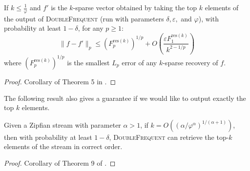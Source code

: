 \documentclass[sigconf,review=true,anonymous=true,screen]{acmart}
\newcommand{\eps}{\varepsilon}
\begin{document}
\begin{theorem}If $k \leq \frac1\varphi$ and $f'$ is the $k$-sparse vector obtained by taking the top $k$ elements of the output
of \textsc{DoubleFrequent} (run with parameters $\delta, \eps, $ and $\varphi$), with probability at least $1 - \delta$, for any $p \geq 1$:
$$\|f - f'\|_p \leq (F_p^{\text{res}(k)})^{1/p} + O\left(\frac{\eps F_1^{\text{res}(k)}}{k^{2-1/p}}\right)$$
where $(F^{\text{res}(k)}_p)^{1/p}$ is the smallest $L_p$ error of any $k$-sparse recovery of $f$.
\end{theorem}
\begin{proof} Corollary of Theorem 5 in \cite{BCIS}.
\end{proof}
The following result also gives a guarantee if we
would like to output exactly the top $k$ elements.
\begin{theorem}
Given a Zipfian stream with parameter $\alpha > 1$, if $k = O((\alpha/\varphi^\alpha)^{1/(\alpha+1)})$, then with probability at least 
$1-\delta$, \textsc{DoubleFrequent} can retrieve the
top-$k$ elements of the stream in correct order.
\end{theorem}
\begin{proof}
Corollary of Theorem 9 of \cite{BCIS}.
\end{proof}

%



% 
\end{document}
